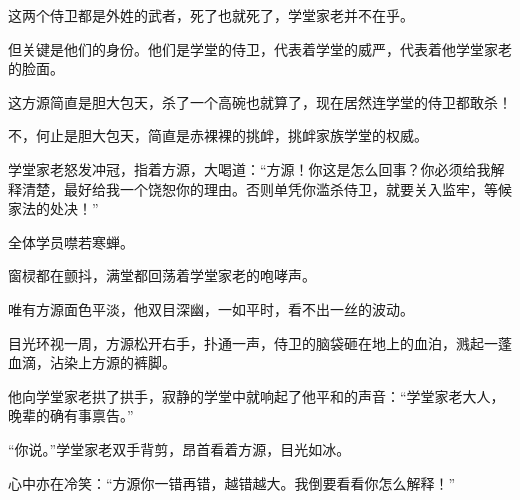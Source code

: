 \begin{this_body}
这两个侍卫都是外姓的武者，死了也就死了，学堂家老并不在乎。

但关键是他们的身份。他们是学堂的侍卫，代表着学堂的威严，代表着他学堂家老的脸面。

这方源简直是胆大包天，杀了一个高碗也就算了，现在居然连学堂的侍卫都敢杀！

不，何止是胆大包天，简直是赤裸裸的挑衅，挑衅家族学堂的权威。

学堂家老怒发冲冠，指着方源，大喝道：“方源！你这是怎么回事？你必须给我解释清楚，最好给我一个饶恕你的理由。否则单凭你滥杀侍卫，就要关入监牢，等候家法的处决！”

全体学员噤若寒蝉。

窗棂都在颤抖，满堂都回荡着学堂家老的咆哮声。

唯有方源面色平淡，他双目深幽，一如平时，看不出一丝的波动。

目光环视一周，方源松开右手，扑通一声，侍卫的脑袋砸在地上的血泊，溅起一蓬血滴，沾染上方源的裤脚。

他向学堂家老拱了拱手，寂静的学堂中就响起了他平和的声音：“学堂家老大人，晚辈的确有事禀告。”

“你说。”学堂家老双手背剪，昂首看着方源，目光如冰。

心中亦在冷笑：“方源你一错再错，越错越大。我倒要看看你怎么解释！”

\end{this_body}

